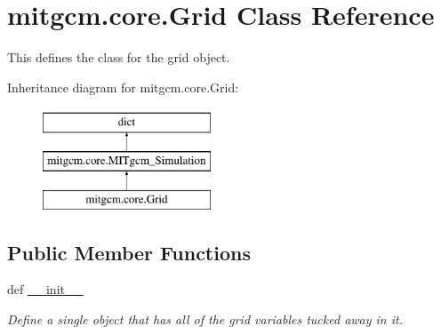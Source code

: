 \hypertarget{classmitgcm_1_1core_1_1Grid}{\section{mitgcm.\+core.\+Grid Class Reference}
\label{classmitgcm_1_1core_1_1Grid}
}


This defines the class for the grid object.  


Inheritance diagram for mitgcm.\+core.\+Grid\+:\begin{figure}[H]
\begin{center}
\leavevmode
\includegraphics[height=3.000000cm]{classmitgcm_1_1core_1_1Grid}
\end{center}
\end{figure}
\subsection*{Public Member Functions}
\begin{DoxyCompactItemize}
\item 
def \hyperlink{classmitgcm_1_1core_1_1Grid_a8697cc503024a546e189c2707c56c0db}{\+\_\+\+\_\+init\+\_\+\+\_\+}
\begin{DoxyCompactList}\small\item\em Define a single object that has all of the grid variables tucked away in it. \end{DoxyCompactList}\end{DoxyCompactItemize}
